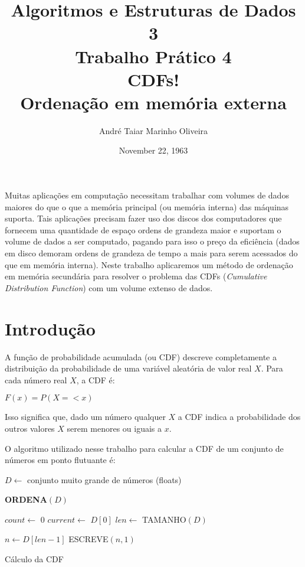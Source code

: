\documentclass[12pt]{article}
\title{Algoritmos e Estruturas de Dados 3 \\ Trabalho Prático 4 \\
\huge{CDFs! \\ Ordenação em memória externa}}
\date{November 22, 1963}
\author{André Taiar Marinho Oliveira}
\begin{document}
\maketitle

\begin{resumo}
Muitas aplicações em computação necessitam trabalhar com volumes de dados maiores do que
o que a memória principal (ou memória interna) das máquinas suporta. Tais aplicações precisam
fazer uso dos discos dos computadores que fornecem uma quantidade de espaço ordens de grandeza 
maior e suportam o volume de dados a ser computado, pagando para isso o preço da eficiência (dados 
em disco demoram ordens de grandeza de tempo a mais para serem acessados do que em memória interna).
Neste trabalho aplicaremos um método de ordenação em memória secundária para resolver o problema
das CDFs (\textit{Cumulative Distribution Function}) com um volume extenso de dados.
\end{resumo}

\section{Introdução}

A função de probabilidade acumulada (ou CDF) descreve completamente a
distribuição da probabilidade de uma variável aleatória de valor real $X$. 
Para cada número real $X$, a CDF é:

$F(x) = P(X =< x)$

Isso significa que, dado um número qualquer $X$ a CDF indica a probabilidade dos
outros valores $X$ serem menores ou iguais a $x$.

O algoritmo utilizado nesse trabalho para calcular a CDF de um conjunto de números em ponto flutuante é:

\begin{algorithm}[h!]
\begin{footnotesize}

$D \longleftarrow $ conjunto muito grande de números (floats)\;

\textbf{ORDENA}$(D)$\; 

$count \longleftarrow$ 0\;
$current \longleftarrow$ $D[0]$\;
$len \longleftarrow$ TAMANHO$(D)$\;

$n \longleftarrow D[len - 1]$\;
ESCREVE$(n, 1)$\;

\caption{Cálculo da CDF}
\end{footnotesize}
\end{algorithm}
\end{document}
